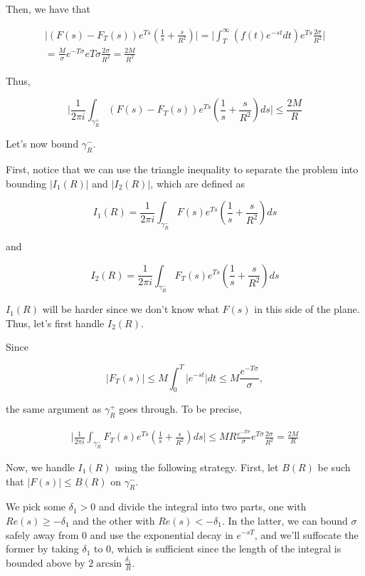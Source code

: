 \documentclass{article}
\theoremstyle{definition}
\begin{document}
Then, we have that

\begin{align*}
    \lvert (F(s) - F_{T}(s)) e^{Ts} (\frac{1}{s} + \frac{s}{R^{2}}) \rvert 
    = \lvert \int_{T}^{\infty} (f(t) e^{-st} dt) e^{Ts} \frac{2 \sigma}{R^{2}} \rvert \\
    = \frac{M}{\sigma} e^{-T\sigma} e{T \sigma}  \frac{2 \sigma}{R^{2}} = \frac{2M}{R^{2}}
\end{align*}

Thus, 

\[ \lvert \frac{1}{2 \pi i} \int_{\gamma_{R}^{+}} (F(s) - F_{T}(s)) e^{Ts} (\frac{1}{s} + \frac{s}{R^{2}}) ds \rvert \leq \frac{2M}{R} \]

Let's now bound $ \gamma_{R}^{-} $. 

First, notice that we can use the triangle inequality to separate the problem into bounding $ \lvert I_{1}(R) \rvert $ and
$ \lvert I_{2}(R) \rvert $, which are defined as

\[ I_{1}(R) = \frac{1}{2 \pi i} \int_{\gamma_{R}^{-}} F(s) e^{Ts} (\frac{1}{s} + \frac{s}{R^{2}}) ds \]

and

\[ I_{2}(R) = \frac{1}{2 \pi i} \int_{\gamma_{R}^{-}} F_{T}(s) e^{Ts} (\frac{1}{s} + \frac{s}{R^{2}}) ds \]

$ I_{1}(R) $ will be harder since we don't know what $ F(s) $ in this side of the plane. Thus, let's first
handle $ I_{2}(R) $.

Since 

\[ \lvert F_{T}(s) \rvert \leq M \int_{0}^{T} \lvert e^{-st} \rvert dt \leq M \frac{e^{-T \sigma}}{\sigma}, \]

the same argument as $ \gamma_{R}^{+} $ goes through. To be precise,

\begin{align*}
    \lvert \frac{1}{2 \pi i} \int_{\gamma_{R}^{-}} F_{T}(s) e^{Ts} (\frac{1}{s} + \frac{s}{R^{2}}) ds \rvert \leq 
    MR \frac{e^{-T \sigma}}{\sigma} e^{T \sigma} \frac{2\sigma}{R^{2}} = \frac{2M}{R}
\end{align*}

Now, we handle $ I_{1}(R) $ using the following strategy.
First, let $ B(R) $ be such that $ \lvert F(s) \rvert \leq B(R) $
on $ \gamma_{R}^{-} $.

We pick some $ \delta_{1} > 0 $ and divide the integral into two parts,
one with $ Re(s) \geq - \delta_{1} $ and the other with $ Re(s) < - \delta_{1} $.
In the latter, we can bound $ \sigma $ safely away from $ 0 $ and use the exponential decay
in $ e^{-sT} $, and we'll suffocate
the former by taking $ \delta_{1} $ to $ 0 $, which is sufficient since 
the length of the integral is bounded above by $ 2 \arcsin \frac{\delta_{1}}{R} $.
\end{document}
